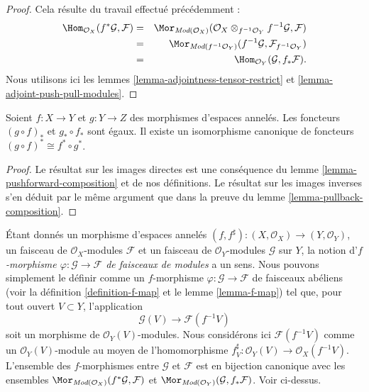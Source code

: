 \begin{proof}
Cela résulte du travail effectué précédemment :
\begin{eqnarray*}
\Hom_{\mathcal{O}_X}(f^*\mathcal{G}, \mathcal{F})
& = &
\Mor_{\textit{Mod}(\mathcal{O}_X)}(
\mathcal{O}_X \otimes_{f^{-1}\mathcal{O}_Y} f^{-1}\mathcal{G}, \mathcal{F}) \\
& = &
\Mor_{\textit{Mod}(f^{-1}\mathcal{O}_Y)}(
f^{-1}\mathcal{G}, \mathcal{F}_{f^{-1}\mathcal{O}_Y}) \\
& = &
\Hom_{\mathcal{O}_Y}(\mathcal{G}, f_*\mathcal{F}).
\end{eqnarray*}
Nous utilisons ici les lemmes \ref{lemma-adjointness-tensor-restrict}
et \ref{lemma-adjoint-push-pull-modules}.
\end{proof}

\begin{lemma}
\label{lemma-push-pull-composition-modules}
Soient $f : X \to Y$ et $g : Y \to Z$ des morphismes d'espaces annelés.
Les foncteurs $(g \circ f)_*$ et $g_* \circ f_*$ sont égaux.
Il existe un isomorphisme canonique de foncteurs
$(g \circ f)^* \cong f^* \circ g^*$.
\end{lemma}

\begin{proof}
Le résultat sur les images directes est une conséquence du lemme
\ref{lemma-pushforward-composition} et de nos définitions.
Le résultat sur les images inverses s'en déduit par le même
argument que dans la preuve du lemme \ref{lemma-pullback-composition}.
\end{proof}


\noindent
Étant donnés un morphisme d'espaces annelés
$(f, f^\sharp) : (X, \mathcal{O}_X) \to (Y, \mathcal{O}_Y)$,
un faisceau de $\mathcal{O}_X$-modules $\mathcal{F}$
et un faisceau de $\mathcal{O}_Y$-modules $\mathcal{G}$ sur $Y$,
la notion d'{\it $f$-morphisme $\varphi : \mathcal{G} \to \mathcal{F}$
de faisceaux de modules} a un sens. Nous pouvons simplement le définir
comme un $f$-morphisme $\varphi : \mathcal{G} \to \mathcal{F}$
de faisceaux abéliens (voir la définition \ref{definition-f-map} et le
lemme \ref{lemma-f-map}) tel que, pour tout ouvert $V \subset Y$, l'application
$$
\mathcal{G}(V) \longrightarrow \mathcal{F}(f^{-1}V)
$$
soit un morphisme de $\mathcal{O}_Y(V)$-modules. Nous considérons ici
$\mathcal{F}(f^{-1}V)$ comme un $\mathcal{O}_Y(V)$-module
au moyen de l'homomorphisme $f^\sharp_V : \mathcal{O}_Y(V) \to \mathcal{O}_X(f^{-1}V)$.
L'ensemble des $f$-morphismes entre
$\mathcal{G}$ et $\mathcal{F}$ est en bijection canonique
avec les ensembles
$\Mor_{\textit{Mod}(\mathcal{O}_X)}(f^*\mathcal{G}, \mathcal{F})$
et
$\Mor_{\textit{Mod}(\mathcal{O}_Y)}(\mathcal{G}, f_*\mathcal{F})$.
Voir ci-dessus.

